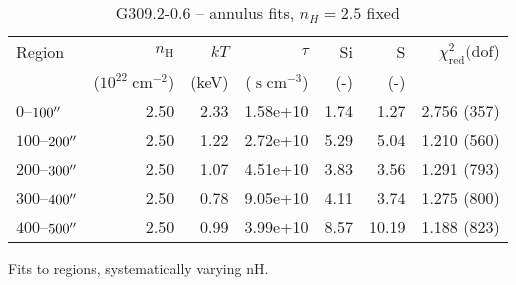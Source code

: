 \documentclass[twocolumn,tighten,trackchanges]{aastex6}
\newcommand*{\mt}{\mathrm}
\newcommand*{\unit}[1]{\;\mt{#1}}  %
\begin{document}
\begin{table*}
    \centering
    \caption{G309.2-0.6 -- annulus fits, $n_H=2.5$ fixed}
    \begin{tabular}{@{}lrrrrrr@{}}
        \toprule
        Region & $n_\mathrm{H}$             & $kT$  & $\tau$                & Si  & S   & $\chi^2_{\mathrm{red}} (\mathrm{dof}$) \\
               & ($10^{22} \unit{cm^{-2}}$) & (keV) & ($\unit{s\;cm^{-3}}$) & (-) & (-) &  \\
        \midrule
        $0$--$100\mbox{$^{\prime\prime}$}$ & 2.50 & 2.33 & 1.58e+10 & 1.74 & 1.27 & 2.756 (357) \\  %
        $100$--$200\mbox{$^{\prime\prime}$}$ & 2.50 & 1.22 & 2.72e+10 & 5.29 & 5.04 & 1.210 (560) \\  %
        $200$--$300\mbox{$^{\prime\prime}$}$ & 2.50 & 1.07 & 4.51e+10 & 3.83 & 3.56 & 1.291 (793) \\  %
        $300$--$400\mbox{$^{\prime\prime}$}$ & 2.50 & 0.78 & 9.05e+10 & 4.11 & 3.74 & 1.275 (800) \\  %
        $400$--$500\mbox{$^{\prime\prime}$}$ & 2.50 & 0.99 & 3.99e+10 & 8.57 & 10.19 & 1.188 (823) \\  %
        \bottomrule
    \end{tabular}
\end{table*}

Fits to regions, systematically varying nH.
\end{document}
